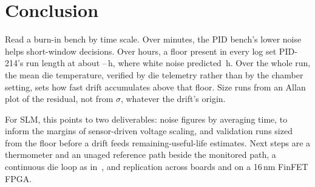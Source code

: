 \documentclass[10pt,twocolumn]{article}
\begin{document}
\section{Conclusion}

Read a burn-in bench by time scale. Over minutes, the PID bench's lower noise helps short-window decisions. Over hours, a floor present in every log set PID-214's run length at about \vDetFairLo--\vDetFairHi\,h, where white noise predicted \vTminBound\,h. Over the whole run, the mean die temperature, verified by die telemetry rather than by the chamber setting, sets how fast drift accumulates above that floor. Size runs from an Allan plot of the residual, not from $\sigma$, whatever the drift's origin.

For SLM, this points to two deliverables: noise figures by averaging time, to inform the margins of sensor-driven voltage scaling, and validation runs sized from the floor before a drift feeds remaining-useful-life estimates. Next steps are a thermometer and an unaged reference path beside the monitored path, a continuous die loop as in~\cite{sobas,xilinx}, and replication across boards and on a 16\,nm FinFET FPGA.
\end{document}

